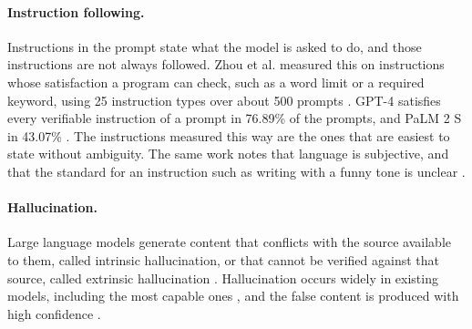 \paragraph{Instruction following.} Instructions in the prompt state what the model is asked to do, and those instructions are not always followed. Zhou et al. measured this on instructions whose satisfaction a program can check, such as a word limit or a required keyword, using 25 instruction types over about 500 prompts \cite{zhouInstructionFollowingEvaluationLarge2023}. GPT-4 satisfies every verifiable instruction of a prompt in 76.89\% of the prompts, and PaLM 2 S in 43.07\% \cite{zhouInstructionFollowingEvaluationLarge2023}. The instructions measured this way are the ones that are easiest to state without ambiguity. The same work notes that language is subjective, and that the standard for an instruction such as writing with a funny tone is unclear \cite{zhouInstructionFollowingEvaluationLarge2023}.

\paragraph{Hallucination.} Large language models generate content that conflicts with the source available to them, called intrinsic hallucination, or that cannot be verified against that source, called extrinsic hallucination \cite{zhaoSurveyLargeLanguage2026, huangSurveyHallucinationLarge2025}. Hallucination occurs widely in existing models, including the most capable ones \cite{zhaoSurveyLargeLanguage2026}, and the false content is produced with high confidence \cite{wangSurveyLargeLanguage2024}.
